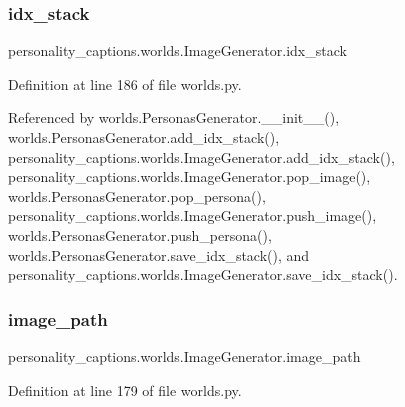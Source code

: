 \subsubsection{\texorpdfstring{idx\+\_\+stack}{idx\_stack}}
{\footnotesize\ttfamily personality\+\_\+captions.\+worlds.\+Image\+Generator.\+idx\+\_\+stack}



Definition at line 186 of file worlds.\+py.



Referenced by worlds.\+Personas\+Generator.\+\_\+\+\_\+init\+\_\+\+\_\+(), worlds.\+Personas\+Generator.\+add\+\_\+idx\+\_\+stack(), personality\+\_\+captions.\+worlds.\+Image\+Generator.\+add\+\_\+idx\+\_\+stack(), personality\+\_\+captions.\+worlds.\+Image\+Generator.\+pop\+\_\+image(), worlds.\+Personas\+Generator.\+pop\+\_\+persona(), personality\+\_\+captions.\+worlds.\+Image\+Generator.\+push\+\_\+image(), worlds.\+Personas\+Generator.\+push\+\_\+persona(), worlds.\+Personas\+Generator.\+save\+\_\+idx\+\_\+stack(), and personality\+\_\+captions.\+worlds.\+Image\+Generator.\+save\+\_\+idx\+\_\+stack().

\mbox{\label{classpersonality__captions_1_1worlds_1_1ImageGenerator_a2f6d917895f5fa19821b69f793dc1dd7}} 
\subsubsection{\texorpdfstring{image\+\_\+path}{image\_path}}
{\footnotesize\ttfamily personality\+\_\+captions.\+worlds.\+Image\+Generator.\+image\+\_\+path}



Definition at line 179 of file worlds.\+py.



